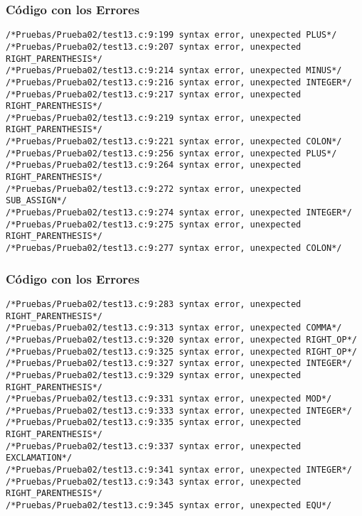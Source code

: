 \documentclass{beamer}
\begin{document}
\begin{frame}[fragile]
\frametitle{C\'odigo con los Errores}
\begin{verbatim}
/*Pruebas/Prueba02/test13.c:9:199 syntax error, unexpected PLUS*/
/*Pruebas/Prueba02/test13.c:9:207 syntax error, unexpected RIGHT_PARENTHESIS*/
/*Pruebas/Prueba02/test13.c:9:214 syntax error, unexpected MINUS*/
/*Pruebas/Prueba02/test13.c:9:216 syntax error, unexpected INTEGER*/
/*Pruebas/Prueba02/test13.c:9:217 syntax error, unexpected RIGHT_PARENTHESIS*/
/*Pruebas/Prueba02/test13.c:9:219 syntax error, unexpected RIGHT_PARENTHESIS*/
/*Pruebas/Prueba02/test13.c:9:221 syntax error, unexpected COLON*/
/*Pruebas/Prueba02/test13.c:9:256 syntax error, unexpected PLUS*/
/*Pruebas/Prueba02/test13.c:9:264 syntax error, unexpected RIGHT_PARENTHESIS*/
/*Pruebas/Prueba02/test13.c:9:272 syntax error, unexpected SUB_ASSIGN*/
/*Pruebas/Prueba02/test13.c:9:274 syntax error, unexpected INTEGER*/
/*Pruebas/Prueba02/test13.c:9:275 syntax error, unexpected RIGHT_PARENTHESIS*/
/*Pruebas/Prueba02/test13.c:9:277 syntax error, unexpected COLON*/
\end{verbatim}
\end{frame}
\begin{frame}[fragile]
\frametitle{C\'odigo con los Errores}
\begin{verbatim}
/*Pruebas/Prueba02/test13.c:9:283 syntax error, unexpected RIGHT_PARENTHESIS*/
/*Pruebas/Prueba02/test13.c:9:313 syntax error, unexpected COMMA*/
/*Pruebas/Prueba02/test13.c:9:320 syntax error, unexpected RIGHT_OP*/
/*Pruebas/Prueba02/test13.c:9:325 syntax error, unexpected RIGHT_OP*/
/*Pruebas/Prueba02/test13.c:9:327 syntax error, unexpected INTEGER*/
/*Pruebas/Prueba02/test13.c:9:329 syntax error, unexpected RIGHT_PARENTHESIS*/
/*Pruebas/Prueba02/test13.c:9:331 syntax error, unexpected MOD*/
/*Pruebas/Prueba02/test13.c:9:333 syntax error, unexpected INTEGER*/
/*Pruebas/Prueba02/test13.c:9:335 syntax error, unexpected RIGHT_PARENTHESIS*/
/*Pruebas/Prueba02/test13.c:9:337 syntax error, unexpected EXCLAMATION*/
/*Pruebas/Prueba02/test13.c:9:341 syntax error, unexpected INTEGER*/
/*Pruebas/Prueba02/test13.c:9:343 syntax error, unexpected RIGHT_PARENTHESIS*/
/*Pruebas/Prueba02/test13.c:9:345 syntax error, unexpected EQU*/
\end{verbatim}
\end{frame}
\end{document}

